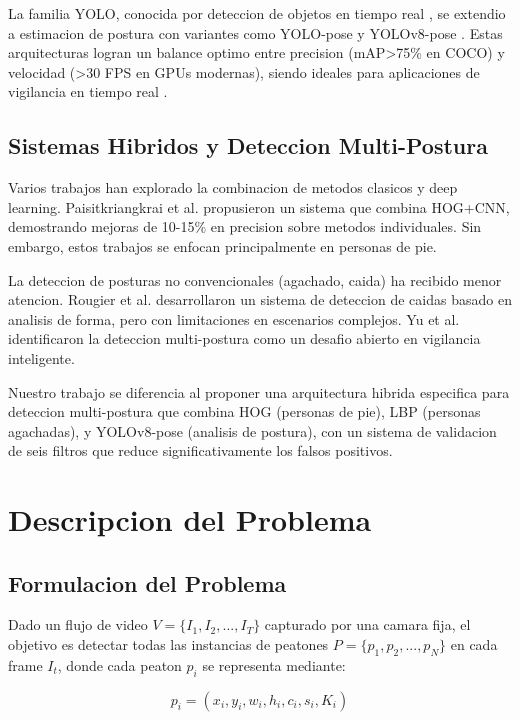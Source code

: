 \documentclass[conference]{IEEEtran}
\begin{document}
La familia YOLO, conocida por deteccion de objetos en tiempo real \cite{redmon2016you}, se extendio a estimacion de postura con variantes como YOLO-pose y YOLOv8-pose \cite{ultralytics2023yolov8}. Estas arquitecturas logran un balance optimo entre precision (mAP>75\% en COCO) y velocidad (>30 FPS en GPUs modernas), siendo ideales para aplicaciones de vigilancia en tiempo real \cite{maji2022yolo}.

\subsection{Sistemas Hibridos y Deteccion Multi-Postura}

Varios trabajos han explorado la combinacion de metodos clasicos y deep learning. Paisitkriangkrai et al. \cite{paisitkriangkrai2016effective} propusieron un sistema que combina HOG+CNN, demostrando mejoras de 10-15\% en precision sobre metodos individuales. Sin embargo, estos trabajos se enfocan principalmente en personas de pie.

La deteccion de posturas no convencionales (agachado, caida) ha recibido menor atencion. Rougier et al. \cite{rougier2011robust} desarrollaron un sistema de deteccion de caidas basado en analisis de forma, pero con limitaciones en escenarios complejos. Yu et al. \cite{yu2012survey} identificaron la deteccion multi-postura como un desafio abierto en vigilancia inteligente.

Nuestro trabajo se diferencia al proponer una arquitectura hibrida especifica para deteccion multi-postura que combina HOG (personas de pie), LBP (personas agachadas), y YOLOv8-pose (analisis de postura), con un sistema de validacion de seis filtros que reduce significativamente los falsos positivos.

\section{Descripcion del Problema}

\subsection{Formulacion del Problema}

Dado un flujo de video $V = \{I_1, I_2, ..., I_T\}$ capturado por una camara fija, el objetivo es detectar todas las instancias de peatones $P = \{p_1, p_2, ..., p_N\}$ en cada frame $I_t$, donde cada peaton $p_i$ se representa mediante:

\begin{equation}
p_i = (x_i, y_i, w_i, h_i, c_i, s_i, K_i)
\end{equation}
\end{document}
